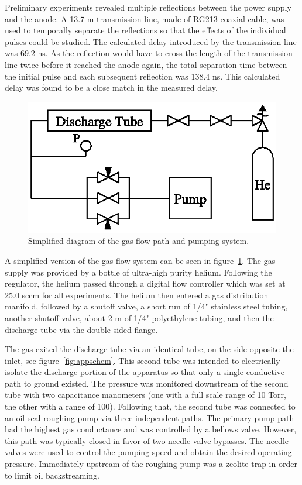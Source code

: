 Preliminary experiments revealed multiple reflections between the power supply
and the anode. A 13.7 m transmission line, made of RG213 coaxial cable, was used
to temporally separate the reflections so that the effects of the individual
pulses could be studied. The calculated delay introduced by the transmission
line was 69.2 ns. As the reflection would have to cross the length of the
transmission line twice before it reached the anode again, the total separation
time between the initial pulse and each subsequent reflection was 138.4 ns. This
calculated delay was found to be a close match in the measured delay.

\begin{figure}
  \centering
  \includegraphics{./chapters/experiment/figures/pump.eps}
  \caption{Simplified diagram of the gas flow path and pumping system.}
  \label{fig:pump}
\end{figure}
A simplified version of the gas flow system can be seen in
figure~\ref{fig:pump}. The gas supply was provided by a bottle of ultra-high
purity helium. Following the regulator, the helium passed through a digital flow
controller which was set at 25.0 sccm for all experiments. The helium then
entered a gas distribution manifold, followed by a shutoff valve, a short run of
1/4" stainless steel tubing, another shutoff valve, about 2 m of 1/4"
polyethylene tubing, and then the discharge tube via the double-sided flange. 

The gas exited the discharge tube via an identical tube, on the side opposite
the inlet, see figure~\ref{fig:appschem}. This second tube was intended to
electrically isolate the discharge portion of the apparatus so that only a
single conductive path to ground existed. The pressure was monitored downstream
of the second tube with two capacitance manometers (one with a full scale range
of 10 Torr, the other with a range of 100). Following that, the second tube was
connected to an oil-seal roughing pump via three independent paths. The primary
pump path had the highest gas conductance and was controlled by a bellows valve.
However, this path was typically closed in favor of two needle valve bypasses.
The needle valves were used to control the pumping speed and obtain the desired
operating pressure. Immediately upstream of the roughing pump was a zeolite trap
in order to limit oil backstreaming.

